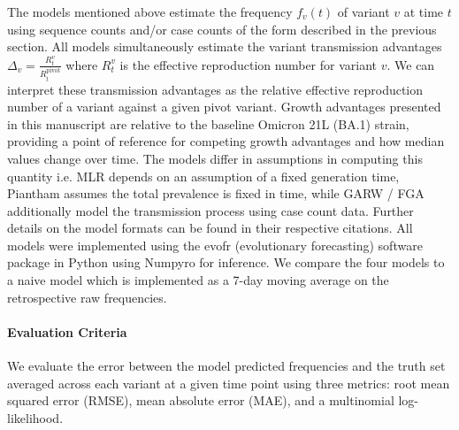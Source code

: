 \documentclass[11pt,oneside,letterpaper]{article}
\begin{document}
The models mentioned above estimate the frequency  $f_{v}(t)$ of variant $v$ at time $t$ using sequence counts and/or case counts of the form described in the previous section.
All models simultaneously estimate the variant transmission advantages $\Delta_{v} = \frac{R_{t}^{v}}{R_{t}^{\text{pivot}}}$ where $R_{t}^{v}$ is the effective reproduction number for variant $v$.
We can interpret these transmission advantages as the relative effective reproduction number of a variant against a given pivot variant.
Growth advantages presented in this manuscript are relative to the baseline Omicron 21L (BA.1) strain, providing a point of reference for competing growth advantages and how median values change over time. 
The models differ in assumptions in computing this quantity i.e. MLR depends on an assumption of a fixed generation time, Piantham assumes the total prevalence is fixed in time, while GARW / FGA additionally model the transmission process using case count data.
Further details on the model formats can be found in their respective citations.
All models were implemented using the evofr (evolutionary forecasting) software package in Python using Numpyro for inference.
We compare the four models to a naive model which is implemented as a 7-day moving average on the retrospective raw frequencies.

%


\paragraph{Evaluation Criteria}

We evaluate the error between the model predicted frequencies and the truth set averaged across each variant at a given time point using three metrics: root mean squared error (RMSE), mean absolute error (MAE), and a multinomial log-likelihood.
\end{document}
